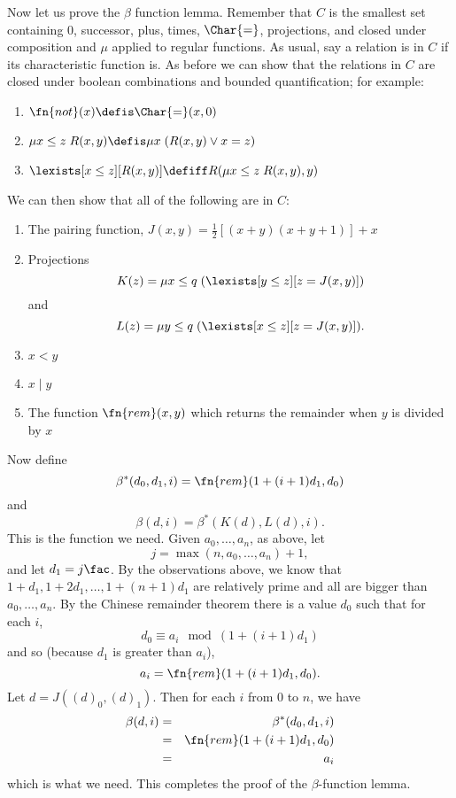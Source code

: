 \documentclass[../../include/open-logic-section]{subfiles}
\begin{document}
Now let us prove the $\beta$ function lemma. Remember that $C$ is the
smallest set containing $0$, successor, plus, times, $\Char{=}$,
projections, and closed under composition and $\mu$ applied to regular
functions. As usual, say a relation is in $C$ if its characteristic
function is. As before we can show that the relations in $C$ are
closed under boolean combinations and bounded quantification; for
example:
\begin{enumerate}
\item $\fn{not}(x) \defis \Char{=}(x,0)$
\item $\mu{x \leq z} \; R(x,y) \defis \mu x \; (R(x,y) \lor x = z)$
\item $\lexists[x \leq z][R(x,y)] \defiff R(\mu {x \leq z} \; R(x,y), y)$
\end{enumerate}
We can then show that all of the following are in $C$:
\begin{enumerate}
\item The pairing function, $J(x,y) = \frac{1}{2}[(x+y)(x+y+1)] + x$
\item Projections 
\[
K(z) = \mu {x \leq q} \; (\lexists[y \leq z][z = J(x,y)])
\]
and
\[
L(z) = \mu {y \leq q} \; (\lexists[x \leq z][z = J(x,y)]).
\]
\item $x < y$
\item $x \mid y$
\item The function $\fn{rem}(x,y)$ which returns the remainder when
  $y$ is divided by $x$
\end{enumerate}
Now define
\[
\beta^*(d_0,d_1,i) = \fn{rem}(1+(i+1) d_1,d_0)
\]
and 
\[
\beta(d,i) = \beta^*(K(d),L(d),i).
\]
This is the function we need. Given $a_0,\dots,a_n$, as above, let 
\[
j = \max(n,a_0,\dots,a_n)+1,
\]
and let $d_1 = j\fac$. By the observations above, we know that $1+d_1,
1+2 d_1, \dots, 1+(n+1) d_1$ are relatively prime and all are bigger
than $a_0,\dots,a_n$. By the Chinese remainder theorem there is a
value $d_0$ such that for each $i$,
\[
d_0 \equiv a_i \mod (1+(i+1)d_1)
\]
and so (because $d_1$ is greater than $a_i$), 
\[
a_i = \fn{rem}(1+(i+1)d_1,d_0).
\]
Let $d = J((d)_0,(d)_1)$. Then for each $i$ from $0$ to $n$, we have
\begin{eqnarray*}
\beta(d,i) & = & \beta^*(d_0,d_1,i) \\
& = & \fn{rem}(1+(i+1) d_1,d_0) \\
& = & a_i
\end{eqnarray*}
which is what we need. This completes the proof of the
$\beta$-function lemma.
\end{document}
